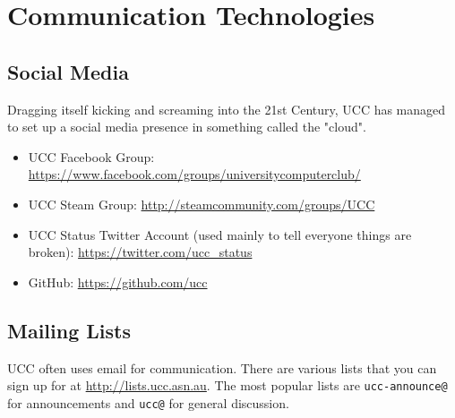 \chapter{Communication Technologies}\label{Communications}


\newenvironment{ucclist}[1]
{
	\begin{mdframed}[nobreak=true]
	\subsection{#1}
	\begin{mdframed}
		Address:  <\href{mailto:#1@ucc.asn.au}{#1@ucc.asn.au}>
	\end{mdframed}
	\begin{mdframed}
		Subscribe:  \small{\url{http://lists.ucc.asn.au/mailman/listinfo/#1}}
	\end{mdframed}


	
}{\end{mdframed}}
\section{Social Media}

Dragging itself kicking and screaming into the 21st Century, UCC has managed to set up a social media presence in something called the "cloud".

\begin{itemize}
\item UCC Facebook Group: \url{https://www.facebook.com/groups/universitycomputerclub/}
\item UCC Steam Group: \url{http://steamcommunity.com/groups/UCC}
\item UCC Status Twitter Account \tiny{(used mainly to tell everyone things are broken)}: \url{https://twitter.com/ucc_status}
\item GitHub: \url{https://github.com/ucc}

\end{itemize}

\section{Mailing Lists}

UCC often uses email for communication. There are various lists that you can sign up for at \url{http://lists.ucc.asn.au}. The most popular lists are \texttt{ucc-announce@} for announcements and \texttt{ucc@} for general discussion.


